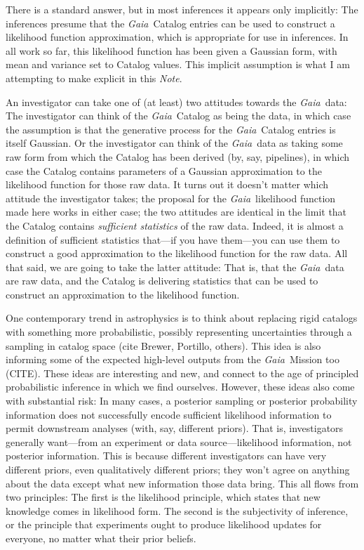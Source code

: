 \documentclass[12pt, modern]{aastex62}
\newcommand{\Gaia}{\textsl{Gaia}}
\newcommand{\documentname}{\textsl{Note}}
\begin{document}
There is a standard answer, but in most inferences it appears only implicitly:
The inferences presume that the \Gaia\ Catalog entries can be used to construct
a likelihood function approximation, which is appropriate for use in inferences.
In all work so far, this likelihood function has been given a Gaussian form,
with mean and variance set to Catalog values.
This implicit assumption is what I am attempting to make explicit in this \documentname.

An investigator can take one of (at least) two attitudes towards the \Gaia\ data:
The investigator can think of the \Gaia\ Catalog as being the data, in which case
the assumption is that the generative process for the \Gaia\ Catalog entries is
itself Gaussian.
Or the investigator can think of the \Gaia\ data as taking some raw form
from which the Catalog has been derived (by, say, pipelines),
in which case the Catalog contains parameters of a Gaussian
approximation to the likelihood function for those raw data.
It turns out it doesn't matter which attitude the investigator takes; the
proposal for the \Gaia\ likelihood function made here works in either case;
the two attitudes are identical in the limit that the Catalog contains
\emph{sufficient statistics} of the raw data.
Indeed, it is almost a definition of sufficient statistics that---if you have them---you
can use them to construct a good approximation to the likelihood function for the
raw data.
All that said, we are going to take the latter attitude: That is, that the
\Gaia\ data are raw data, and the Catalog is delivering statistics that can
be used to construct an approximation to the likelihood function.

One contemporary trend in astrophysics is to think about replacing rigid
catalogs with something more probabilistic, possibly representing uncertainties
through a sampling in catalog space (cite Brewer, Portillo, others).
This idea is also informing some of the expected high-level outputs from
the \Gaia\ Mission too (CITE).
These ideas are interesting and new, and connect to the age of principled
probabilistic inference in which we find ourselves.
However, these ideas also come with substantial risk:
In many cases, a posterior sampling or posterior probability information
does not successfully encode sufficient likelihood information to permit
downstream analyses (with, say, different priors).
That is, investigators generally want---from an experiment or data source---likelihood
information, not posterior information.
This is because different investigators can have very different priors,
even qualitatively different priors; they won't agree on anything about the
data except what new information those data bring.
This all flows from two principles: The first is the likelihood principle,
which states that new knowledge comes in likelihood form.
The second is the subjectivity of inference, or the principle that
experiments ought to produce likelihood updates for everyone, no matter
what their prior beliefs.
\end{document}
